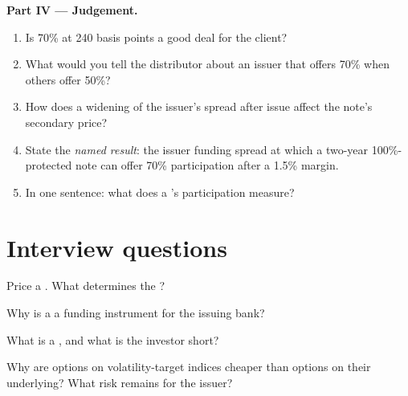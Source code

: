 \begin{problem}
\medskip\noindent\textbf{Part IV --- Judgement.}
\begin{enumerate}[resume]
\item Is 70\% at 240 basis points a good deal for the client?
\item What would you tell the distributor about an issuer that offers 70\% when others offer 50\%?
\item How does a widening of the issuer's spread after issue affect the note's secondary price?
\item State the \emph{named result}: the issuer funding spread at which a two-year 100\%-protected note can offer 70\% participation after a
1.5\% margin.
\item In one sentence: what does a 's participation measure?
\end{enumerate}
\end{problem}

\section{Interview questions}

\begin{interviewq}\label{iq:dv:the-structured-products-business:1}
Price a . What determines the ?
\end{interviewq}

\begin{interviewq}\label{iq:dv:the-structured-products-business:2}
Why is a  a funding instrument for the issuing bank?
\end{interviewq}

\begin{interviewq}\label{iq:dv:the-structured-products-business:3}
What is a , and what is the investor short?
\end{interviewq}

\begin{interviewq}\label{iq:dv:the-structured-products-business:4}
Why are options on volatility-target indices cheaper than options on their underlying? What risk remains for the issuer?
\end{interviewq}

